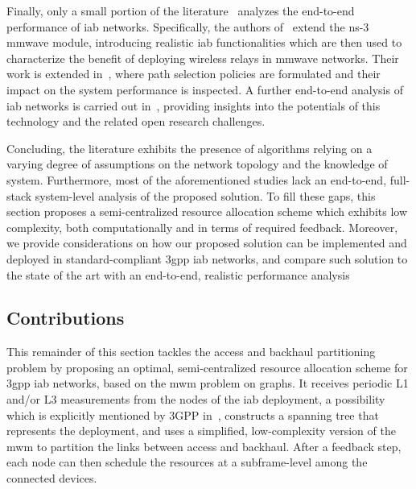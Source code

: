Finally, only a small portion of the literature~\cite{polese2018end, polese2018iab, polese2020integrated} analyzes the end-to-end performance of \gls{iab} networks. Specifically, the authors of~\cite{polese2018end} extend the ns-3 \gls{mmwave} module, introducing realistic \gls{iab} functionalities which are then used to characterize the benefit of deploying wireless relays in \gls{mmwave} networks. Their work is extended in~\cite{polese2018iab}, where path selection policies are formulated and their impact on the system performance is inspected. A further end-to-end analysis of \gls{iab} networks is carried out in~\cite{polese2020integrated}, providing insights into the potentials of this technology and the related open research challenges.

Concluding, the literature exhibits the presence of algorithms relying on a varying degree of assumptions on the network topology and the knowledge of system. Furthermore, most of the aforementioned studies lack an end-to-end, full-stack system-level analysis of the proposed solution.
To fill these gaps, this section proposes a semi-centralized resource allocation scheme which exhibits low complexity, both computationally and in terms of required feedback. Moreover, we provide considerations on how our proposed solution can be implemented and deployed in standard-compliant \gls{3gpp} \gls{iab} networks, and compare such solution to the state of the art with an end-to-end, realistic performance analysis

\subsection{Contributions}
\label{sec:contributions}

This remainder of this section tackles the access and backhaul partitioning problem by proposing an optimal, semi-centralized resource allocation scheme for \gls{3gpp} \gls{iab} networks, based on the \gls{mwm} problem on graphs. It receives periodic L1 and/or L3 measurements from the nodes of the \gls{iab} deployment, a possibility which is explicitly mentioned by 3GPP in~\cite[Section 7.3.3]{3gpp_38_874}, constructs a spanning tree that represents the deployment, and uses a simplified, low-complexity version of the \gls{mwm} to partition the links between access and backhaul. After a feedback step, each node can then schedule the resources at a subframe-level among the connected devices. 

